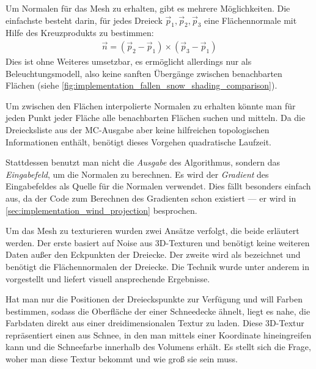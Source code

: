 Um Normalen für das Mesh zu erhalten, gibt es mehrere
Möglichkeiten. Die einfachste besteht darin, für jedes Dreieck
$\vec{p}_1,\vec{p}_2,\vec{p}_3$ eine Flächennormale mit Hilfe des Kreuzprodukts zu bestimmen:
\begin{align}
\vec{n} = (\vec{p}_2 - \vec{p}_1) \times (\vec{p}_3 - \vec{p}_1)
\end{align}
Dies ist ohne Weiteres umsetzbar, es ermöglicht allerdings nur
 als Beleuchtungsmodell, also keine
sanften Übergänge zwischen benachbarten Flächen (siehe
\cref{fig:implementation_fallen_snow_shading_comparison}).

Um zwischen den Flächen interpolierte Normalen zu erhalten könnte man
für jeden Punkt jeder Fläche alle benachbarten Flächen suchen und
mitteln. Da die Dreiecksliste aus der MC-Ausgabe aber keine
hilfreichen topologischen Informationen enthält, benötigt dieses
Vorgehen quadratische Laufzeit.

Stattdessen benutzt man nicht die \emph{Ausgabe} des Algorithmus,
sondern das \emph{Eingabefeld}, um die Normalen zu berechnen. Es wird
der \emph{Gradient} des Eingabefeldes als Quelle für die Normalen
verwendet. Dies fällt besonders einfach aus, da der Code zum Berechnen
des Gradienten schon existiert --- er wird in
\cref{sec:implementation_wind_projection} besprochen.

Um das Mesh zu texturieren wurden zwei Ansätze verfolgt, die beide
erläutert werden. Der erste basiert auf Noise aus 3D-Texturen und
benötigt keine weiteren Daten außer den Eckpunkten der Dreiecke. Der
zweite wird als  bezeichnet
und benötigt die Flächennormalen der Dreiecke. Die Technik wurde unter
anderem in \cite{Nguyen:2007:GG:1407436} vorgestellt und liefert
visuell ansprechende Ergebnisse.

Hat man nur die Positionen der Dreieckspunkte zur Verfügung und will
Farben bestimmen, sodass die Oberfläche der einer Schneedecke ähnelt,
liegt es nahe, die Farbdaten direkt aus einer dreidimensionalen Textur
zu laden. Diese 3D-Textur repräsentiert einen 
aus Schnee, in den man mittels einer Koordinate hineingreifen kann und
die Schneefarbe innerhalb des Volumens erhält. Es stellt sich die
Frage, woher man diese Textur bekommt und wie groß sie sein muss.

